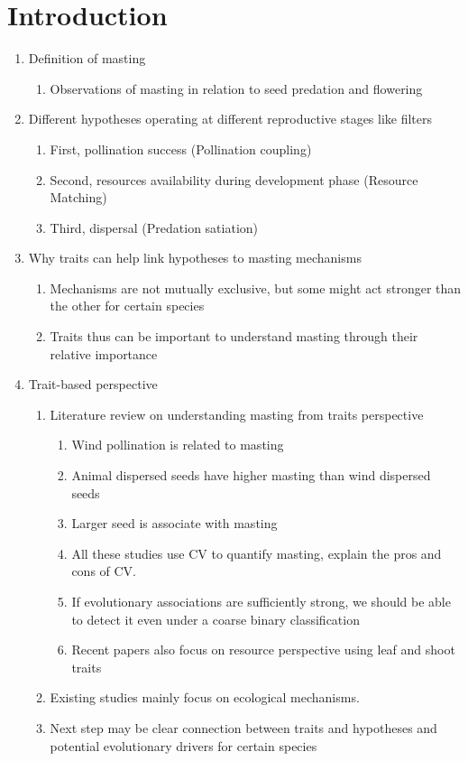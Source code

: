 \documentclass{article}
\begin{document}


\section{Introduction}
\begin{enumerate}
\item Definition of masting 
\begin{enumerate}
\item Observations of masting in relation to seed predation and flowering
\end{enumerate}
\item Different hypotheses operating at different reproductive stages like filters
\begin{enumerate} 
\item First, pollination success (Pollination coupling)
\item Second, resources availability during development phase (Resource Matching)
\item Third, dispersal (Predation satiation)
\end{enumerate}
\item Why traits can help link hypotheses to masting mechanisms
\begin{enumerate}
\item Mechanisms are not mutually exclusive, but some might act stronger than the other for certain species
\item Traits thus can be important to understand masting through their relative importance
\end{enumerate}
\item Trait-based perspective
\begin{enumerate}
\item Literature review on understanding masting from traits perspective 
\begin{enumerate}
\item Wind pollination is related to masting
\item Animal dispersed seeds have higher masting than wind dispersed seeds
\item Larger seed is associate with masting
\item All these studies use CV to quantify masting, explain the pros and cons of CV.
\item If evolutionary associations are sufficiently strong, we should be able to detect it even under a coarse binary classification
\item Recent papers also focus on resource perspective using leaf and shoot traits
\end{enumerate}
\item Existing studies mainly focus on ecological mechanisms.
\item Next step may be clear connection between traits and hypotheses and potential evolutionary drivers for certain species
\end{enumerate}


\end{enumerate}
\end{document}
